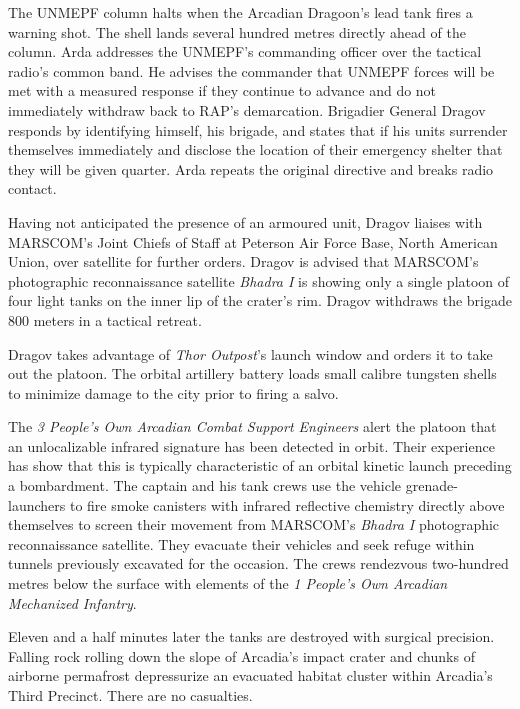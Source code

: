 The UNMEPF column halts when the Arcadian Dragoon's lead tank fires a warning shot. The shell lands several hundred metres directly ahead of the column. Arda addresses the UNMEPF's commanding officer over the tactical radio's common band. He advises the commander that UNMEPF forces will be met with a measured response if they continue to advance and do not immediately withdraw back to RAP's demarcation. Brigadier General Dragov responds by identifying himself, his brigade, and states that if his units surrender themselves immediately and disclose the location of their emergency shelter that they will be given quarter. Arda repeats the original directive and breaks radio contact.

Having not anticipated the presence of an armoured unit, Dragov liaises with MARSCOM's Joint Chiefs of Staff at Peterson Air Force Base, North American Union, over satellite for further orders. Dragov is advised that MARSCOM's photographic reconnaissance satellite {\it Bhadra I} is showing only a single platoon of four light tanks on the inner lip of the crater's rim. Dragov withdraws the brigade 800 meters in a tactical retreat.
\StopTimelineDate

Dragov takes advantage of {\it Thor Outpost}'s launch window and orders it to take out the platoon. The orbital artillery battery loads small calibre tungsten shells to minimize damage to the city prior to firing a salvo. 

The {\it 3 People's Own Arcadian Combat Support Engineers} alert the platoon that an unlocalizable infrared signature has been detected in orbit. Their experience has show that this is typically characteristic of an orbital kinetic launch preceding a bombardment. The captain and his tank crews use the vehicle grenade-launchers to fire smoke canisters with infrared reflective chemistry directly above themselves to screen their movement from MARSCOM's {\it Bhadra I} photographic reconnaissance satellite. They evacuate their vehicles and seek refuge within tunnels previously excavated for the occasion. The crews rendezvous two-hundred metres below the surface with elements of the {\it 1 People's Own Arcadian Mechanized Infantry}.

Eleven and a half minutes later the tanks are destroyed with surgical precision. Falling rock rolling down the slope of Arcadia's impact crater and chunks of airborne permafrost depressurize an evacuated habitat cluster within Arcadia's Third Precinct. There are no casualties.

